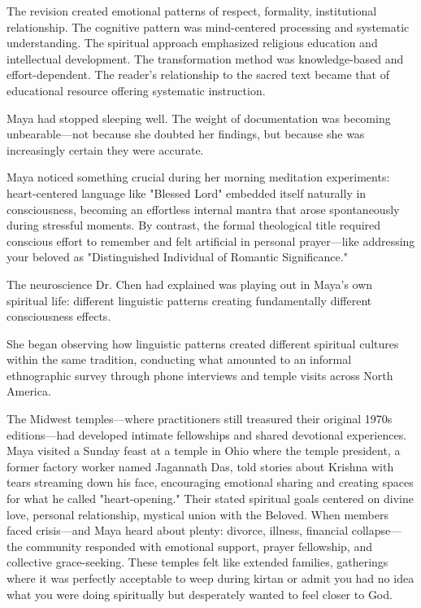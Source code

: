 \documentclass[12pt,twoside]{book}
\begin{document}
The revision created emotional patterns of respect, formality, institutional relationship. The cognitive pattern was mind-centered processing and systematic understanding. The spiritual approach emphasized religious education and intellectual development. The transformation method was knowledge-based and effort-dependent. The reader's relationship to the sacred text became that of educational resource offering systematic instruction.

Maya had stopped sleeping well. The weight of documentation was becoming unbearable—not because she doubted her findings, but because she was increasingly certain they were accurate.

Maya noticed something crucial during her morning meditation experiments: heart-centered language like "Blessed Lord" embedded itself naturally in consciousness, becoming an effortless internal mantra that arose spontaneously during stressful moments. By contrast, the formal theological title required conscious effort to remember and felt artificial in personal prayer—like addressing your beloved as "Distinguished Individual of Romantic Significance."

The neuroscience Dr. Chen had explained was playing out in Maya's own spiritual life: different linguistic patterns creating fundamentally different consciousness effects.

She began observing how linguistic patterns created different spiritual cultures within the same tradition, conducting what amounted to an informal ethnographic survey through phone interviews and temple visits across North America.

The Midwest temples—where practitioners still treasured their original 1970s editions—had developed intimate fellowships and shared devotional experiences. Maya visited a Sunday feast at a temple in Ohio where the temple president, a former factory worker named Jagannath Das, told stories about Krishna with tears streaming down his face, encouraging emotional sharing and creating spaces for what he called "heart-opening." Their stated spiritual goals centered on divine love, personal relationship, mystical union with the Beloved. When members faced crisis—and Maya heard about plenty: divorce, illness, financial collapse—the community responded with emotional support, prayer fellowship, and collective grace-seeking. These temples felt like extended families, gatherings where it was perfectly acceptable to weep during kirtan or admit you had no idea what you were doing spiritually but desperately wanted to feel closer to God.
\end{document}
